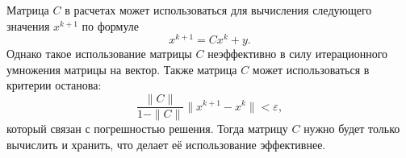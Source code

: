 \documentclass{article}
\begin{document}
\begin{enumerate}
        Матрица $C$ в расчетах может использоваться для вычисления следующего значения $x^{k+1}$ по формуле
        \begin{equation*}
            x^{k+1} = C x^k +y.
        \end{equation*}
        Однако такое использование матрицы $C$ неэффективно в силу итерационного умножения матрицы на вектор.
        Также матрица $C$ может использоваться в критерии останова: 
        \begin{equation*}
            \dfrac{\|C\|}{1-\|C\|} \|x^{k+1} - x^k\| < \varepsilon,
        \end{equation*}
        который связан с погрешностью решения. Тогда матрицу $C$ нужно будет только вычислить и хранить, что делает 
        её использование эффективнее.
    \end{enumerate}

    
\end{document}
